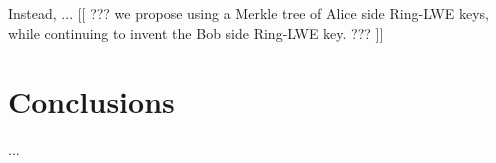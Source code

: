 \documentclass{llncs}
\begin{document}
Instead, ...
[[ ??? we propose using a Merkle tree of Alice side Ring-LWE keys,
while continuing to invent the Bob side Ring-LWE key. ??? ]]


\section{Conclusions}

...






\end{document}
